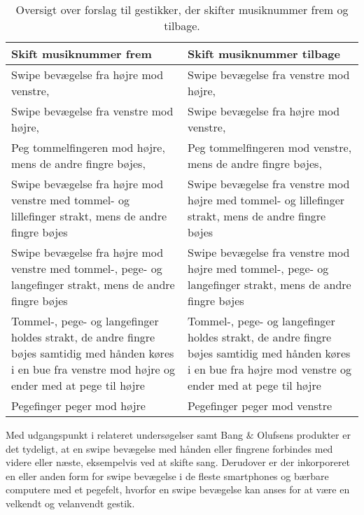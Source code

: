 \begin{table}[H]
	\centering
	\begin{tabular}{| p{6cm} | p{6cm} |}
		\hline
		\textbf{Skift musiknummer frem} & \textbf{Skift musiknummer tilbage} \\ \hline
		Swipe bevægelse fra højre mod venstre, \parencite[s. 48]{WEB:Beosound2, WEB:BeosoundMoment, PDF:UserDefinedGesturesTV} & Swipe bevægelse fra venstre mod højre, \parencite[s. 48]{WEB:Beosound2, WEB:BeosoundMoment, PDF:UserDefinedGesturesTV} \\ \hline
		Swipe bevægelse fra venstre mod højre, \parencite[s. 166]{PDF:ComparingInputModalities}  & Swipe bevægelse fra højre mod venstre, \parencite[s. 166]{PDF:ComparingInputModalities}  \\ \hline
		Peg tommelfingeren mod højre, mens de andre fingre bøjes, \parencite[s. 166]{PDF:ComparingInputModalities} & Peg tommelfingeren mod venstre, mens de andre fingre bøjes, \parencite[s. 166]{PDF:ComparingInputModalities} \\ \hline
		Swipe bevægelse fra højre mod venstre med tommel- og lillefinger strakt, mens de andre fingre bøjes & Swipe bevægelse fra venstre mod højre med tommel- og lillefinger strakt, mens de andre fingre bøjes \\ \hline
		Swipe bevægelse fra højre mod venstre med tommel-, pege- og langefinger strakt, mens de andre fingre bøjes & Swipe bevægelse fra venstre mod højre med tommel-, pege- og langefinger strakt, mens de andre fingre bøjes \\ \hline
		Tommel-, pege- og langefinger holdes strakt, de andre fingre bøjes samtidig med hånden køres i en bue fra venstre mod højre og ender med at pege til højre & Tommel-, pege- og langefinger holdes strakt, de andre fingre bøjes samtidig med hånden køres i en bue fra højre mod venstre og ender med at pege til højre\\ \hline
		Pegefinger peger mod højre & Pegefinger peger mod venstre\\ \hline
	\end{tabular}
	\caption{Oversigt over forslag til gestikker, der skifter musiknummer frem og tilbage.}
	\label{tab:IndsamledeGestikkerSkift}
\end{table}
\noindent
%
Med udgangspunkt i relateret undersøgelser samt Bang $\&$ Olufsens produkter er det tydeligt, at en swipe bevægelse med hånden eller fingrene forbindes med videre eller næste, eksempelvis ved at skifte sang. Derudover er der inkorporeret en eller anden form for swipe bevægelse i de fleste smartphones og bærbare computere med et pegefelt, hvorfor en swipe bevægelse kan anses for at være en velkendt og velanvendt gestik.

